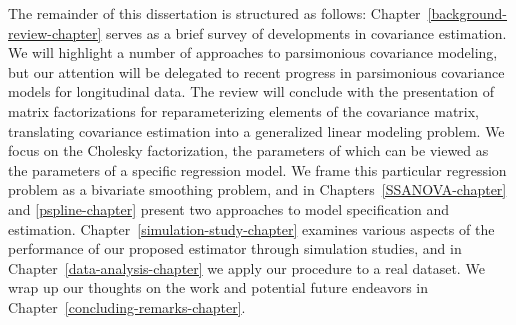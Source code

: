 \bigskip

The remainder of this dissertation is structured as follows: Chapter~\ref{background-review-chapter} serves as a brief survey of developments in covariance estimation.  We will highlight a number of approaches to parsimonious covariance modeling, but our attention will be delegated to recent progress in parsimonious covariance models for longitudinal data. The review will conclude with the presentation of matrix factorizations for reparameterizing elements of the covariance matrix, translating covariance estimation into a generalized linear modeling problem. We focus on the Cholesky factorization, the parameters of which can be viewed as the parameters of a specific regression model. We frame this particular regression problem as a bivariate smoothing problem, and in Chapters~\ref{SSANOVA-chapter} and \ref{pspline-chapter} present two approaches to model specification and estimation. Chapter~\ref{simulation-study-chapter} examines various aspects of the performance of our proposed estimator through simulation studies, and in Chapter~\ref{data-analysis-chapter} we apply our procedure to a real dataset. We wrap up our thoughts on the work and potential future endeavors in Chapter~\ref{concluding-remarks-chapter}. 

